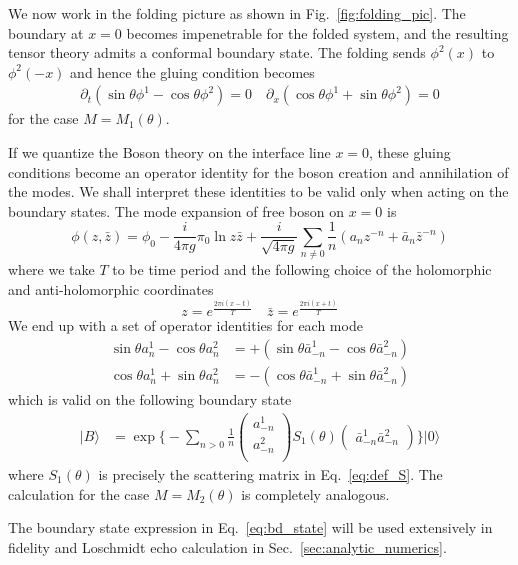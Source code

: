 We now work in the folding picture as shown in Fig.~\ref{fig:folding_pic}. The boundary at $x=0$ becomes impenetrable for the folded system, and the resulting tensor theory admits a conformal boundary state. The folding sends $\phi^2(x)$ to $\phi^2(-x)$ and hence the gluing condition becomes
\begin{equation}
\begin{aligned}
\partial_t(\sin\theta\phi^1-\cos\theta\phi^2)=0 \quad
\partial_x(\cos\theta\phi^1+\sin\theta\phi^2)=0 
\end{aligned}
\end{equation}
for the case $M = M_1(\theta)$. 

If we quantize the Boson theory on the interface line $x = 0$, these gluing conditions become an operator identity for the boson creation and annihilation of the modes. We shall interpret these identities to be valid only when acting on the boundary states. The mode expansion of free boson on $x = 0$\cite{di_francesco_conformal_1997} is
\begin{equation}
\phi(z, \bar{z} ) = \phi_0 - \frac{i}{4\pi g } \pi_0 \ln z \bar{z}  + \frac{i}{\sqrt{4\pi g} } \sum_{n \ne 0 } \frac{1}{n} \left(a_n z^{-n} + \bar{a}_{n} \bar{z}^{-n}   \right)
\end{equation}
where we take $T$ to be time period and the following choice of the holomorphic and anti-holomorphic coordinates
\begin{equation}
z= e^{ \frac{2\pi i(x - t)}{T} } \quad \bar{z} = e^{ \frac{2\pi i( x + t  )}{T} }
\end{equation}
We end up with a set of operator identities for each mode
\begin{equation}
\begin{aligned}
\label{eq:rotation_a_basis}
\sin  \theta a^1_n - \cos \theta a^2_n  &= + \left( \sin  \theta \bar{a}^1_{-n} - \cos \theta \bar{a}^2_{-n} \right)\\
\cos  \theta a^1_n + \sin \theta a^2_n  &= - \left( \cos  \theta \bar{a}^1_{-n} + \sin \theta \bar{a}^2_{-n} \right) 
\end{aligned}
\end{equation}
which is valid on the following boundary state
\begin{equation}
\label{eq:bd_state}
\begin{aligned}
| B \rangle 
& =  \exp\Big\{ -\sum_{n > 0 } \frac{1}{n}
\begin{pmatrix}
a_{-n}^1\\
a_{-n}^2\\                              
\end{pmatrix}
S_1( \theta )
\begin{pmatrix}
\bar{a}_{-n}^1  \bar{a}_{-n}^2
\end{pmatrix} \Big\} |0\rangle
\end{aligned}
\end{equation}
where $S_1(\theta) $ is precisely the scattering matrix in Eq.~\eqref{eq:def_S}. The calculation for the case $M=M_2(\theta)$ is completely analogous. 

The boundary state expression in Eq.~\eqref{eq:bd_state} will be used extensively in fidelity and Loschmidt echo calculation in Sec.~\ref{sec:analytic_numerics}. 

